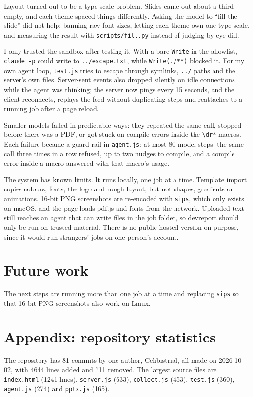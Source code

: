 \documentclass[11pt]{article}
\begin{document}
Layout turned out to be a type-scale problem. Slides came out about a third empty, and each theme spaced things differently. Asking the model to ``fill the slide'' did not help; banning raw font sizes, letting each theme own one type scale, and measuring the result with \texttt{scripts/fill.py} instead of judging by eye did.

I only trusted the sandbox after testing it. With a bare \texttt{Write} in the allowlist, \texttt{claude -p} could write to \texttt{../escape.txt}, while \texttt{Write(./**)} blocked it. For my own agent loop, \texttt{test.js} tries to escape through symlinks, \texttt{../} paths and the server's own files. Server-sent events also dropped silently on idle connections while the agent was thinking; the server now pings every 15 seconds, and the client reconnects, replays the feed without duplicating steps and reattaches to a running job after a page reload.

Smaller models failed in predictable ways: they repeated the same call, stopped before there was a PDF, or got stuck on compile errors inside the \texttt{\textbackslash dr*} macros. Each failure became a guard rail in \texttt{agent.js}: at most 80 model steps, the same call three times in a row refused, up to two nudges to compile, and a compile error inside a macro answered with that macro's usage.

The system has known limits. It runs locally, one job at a time. Template import copies colours, fonts, the logo and rough layout, but not shapes, gradients or animations. 16-bit PNG screenshots are re-encoded with \texttt{sips}, which only exists on macOS, and the page loads pdf.js and fonts from the network. Uploaded text still reaches an agent that can write files in the job folder, so devreport should only be run on trusted material. There is no public hosted version on purpose, since it would run strangers' jobs on one person's account.

\section{Future work}

The next steps are running more than one job at a time and replacing \texttt{sips} so that 16-bit PNG screenshots also work on Linux.

\section*{Appendix: repository statistics}

The repository has 81 commits by one author, Celibistrial, all made on 2026-10-02, with 4644 lines added and 711 removed. The largest source files are \texttt{index.html} (1241 lines), \texttt{server.js} (633), \texttt{collect.js} (453), \texttt{test.js} (360), \texttt{agent.js} (274) and \texttt{pptx.js} (165).
\end{document}
